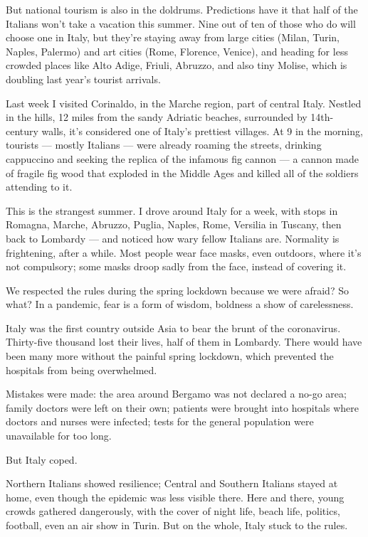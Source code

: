 But national tourism is also in the doldrums. Predictions have it that
half of the Italians won't take a vacation this summer. Nine out of ten
of those who do will choose one in Italy, but they're staying away from
large cities (Milan, Turin, Naples, Palermo) and art cities (Rome,
Florence, Venice), and heading for less crowded places like Alto Adige,
Friuli, Abruzzo, and also tiny Molise, which is doubling last year's
tourist arrivals.

Last week I visited Corinaldo, in the Marche region, part of central
Italy. Nestled in the hills, 12 miles from the sandy Adriatic beaches,
surrounded by 14th-century walls, it's considered one of Italy's
prettiest villages. At 9 in the morning, tourists --- mostly Italians
--- were already roaming the streets, drinking cappuccino and seeking
the replica of the infamous fig cannon --- a cannon made of fragile fig
wood that exploded in the Middle Ages and killed all of the soldiers
attending to it.

This is the strangest summer. I drove around Italy for a week, with
stops in Romagna, Marche, Abruzzo, Puglia, Naples, Rome, Versilia in
Tuscany, then back to Lombardy --- and noticed how wary fellow Italians
are. Normality is frightening, after a while. Most people wear face
masks, even outdoors, where it's not compulsory; some masks droop sadly
from the face, instead of covering it.

We respected the rules during the spring lockdown because we were
afraid? So what? In a pandemic, fear is a form of wisdom, boldness a
show of carelessness.

Italy was the first country outside Asia to bear the brunt of the
coronavirus. Thirty-five thousand lost their lives, half of them in
Lombardy. There would have been many more without the painful spring
lockdown, which prevented the hospitals from being overwhelmed.

Mistakes were made: the area around Bergamo was not declared a no-go
area; family doctors were left on their own; patients were brought into
hospitals where doctors and nurses were infected; tests for the general
population were unavailable for too long.

But Italy coped.

Northern Italians showed resilience; Central and Southern Italians
stayed at home, even though the epidemic was less visible there. Here
and there, young crowds gathered dangerously, with the cover of night
life, beach life, politics, football, even an air show in Turin. But on
the whole, Italy stuck to the rules.

